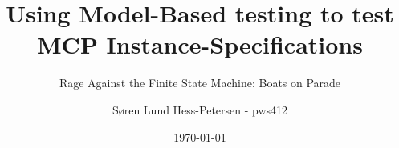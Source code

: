 \documentclass[a4paper,11pt,oneside]{memoir}
\begin{document}

\thesiscomment{} %
\title{Using Model-Based testing to test MCP Instance-Specifications}
\subtitle{Rage Against the Finite State Machine: Boats on Parade} %
\author{Søren Lund Hess-Petersen - pws412}
\date{\today} %

\pagestyle{plain}
\maketitle

\cleardoublepage
{}
\setcounter{page}{3}

\cleardoublepage
\pagestyle{plain}

\begin{abstract}
\end{abstract}

\begin{resume}
\end{resume}



\cleardoublepage
{}
\tableofcontents*

\cleardoublepage
{}
\setcounter{page}{1}





\displayCounterChp



\displayCounterChp
\end{document}
